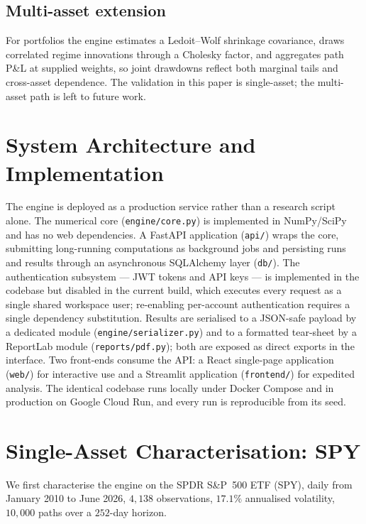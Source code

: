 \documentclass[11pt]{article}
\theoremstyle{definition}
\begin{document}
\subsection{Multi-asset extension}
For portfolios the engine estimates a Ledoit--Wolf shrinkage covariance, draws
correlated regime innovations through a Cholesky factor, and aggregates path
P\&L at supplied weights, so joint drawdowns reflect both marginal tails and
cross-asset dependence. The validation in this paper is single-asset; the
multi-asset path is left to future work.

\section{System Architecture and Implementation}
\label{sec:system}

The engine is deployed as a production service rather than a research script
alone. The numerical core (\texttt{engine/core.py}) is implemented in NumPy/SciPy
and has no web dependencies. A FastAPI application (\texttt{api/}) wraps the core,
submitting long-running computations as background jobs and persisting runs and
results through an asynchronous SQLAlchemy layer (\texttt{db/}). The authentication
subsystem --- JWT tokens and API keys --- is implemented in the codebase but
disabled in the current build, which executes every request as a single shared
workspace user; re-enabling per-account authentication requires a single
dependency substitution. Results are serialised to a JSON-safe payload by a
dedicated module (\texttt{engine/serializer.py}) and to a formatted tear-sheet by
a ReportLab module (\texttt{reports/pdf.py}); both are exposed as direct exports in
the interface. Two front-ends consume the API: a React single-page application
(\texttt{web/}) for interactive use and a Streamlit application (\texttt{frontend/})
for expedited analysis. The identical codebase runs locally under Docker Compose
and in production on Google Cloud Run, and every run is reproducible from its seed.

\section{Single-Asset Characterisation: SPY}
\label{sec:spy}

We first characterise the engine on the SPDR S\&P~500 ETF (SPY), daily from
January 2010 to June 2026, $4{,}138$ observations, $17.1\%$ annualised
volatility, $10{,}000$ paths over a $252$-day horizon.
\end{document}
